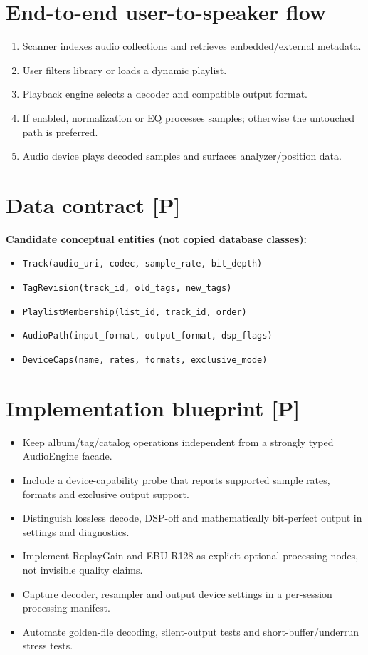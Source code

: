 \documentclass[10pt,a4paper,oneside]{report}
\begin{document}
\section{End-to-end user-to-speaker flow}
\begin{enumerate}[leftmargin=*,itemsep=2pt,topsep=2pt]
\item Scanner indexes audio collections and retrieves embedded/external metadata.
\item User filters library or loads a dynamic playlist.
\item Playback engine selects a decoder and compatible output format.
\item If enabled, normalization or EQ processes samples; otherwise the untouched path is preferred.
\item Audio device plays decoded samples and surfaces analyzer/position data.
\end{enumerate}
\section{Data contract [P]}
\begin{evidencebox}\small\textbf{Candidate conceptual entities (not copied database classes):}\par
\begin{itemize}[leftmargin=*,itemsep=1pt,topsep=2pt]
\item \texttt{Track(audio\_uri, codec, sample\_rate, bit\_depth)}
\item \texttt{TagRevision(track\_id, old\_tags, new\_tags)}
\item \texttt{PlaylistMembership(list\_id, track\_id, order)}
\item \texttt{AudioPath(input\_format, output\_format, dsp\_flags)}
\item \texttt{DeviceCaps(name, rates, formats, exclusive\_mode)}
\end{itemize}\end{evidencebox}
\section{Implementation blueprint [P]}
\begin{itemize}[leftmargin=*,itemsep=2pt,topsep=3pt]
\item Keep album/tag/catalog operations independent from a strongly typed AudioEngine facade.
\item Include a device-capability probe that reports supported sample rates, formats and exclusive output support.
\item Distinguish lossless decode, DSP-off and mathematically bit-perfect output in settings and diagnostics.
\item Implement ReplayGain and EBU R128 as explicit optional processing nodes, not invisible quality claims.
\item Capture decoder, resampler and output device settings in a per-session processing manifest.
\item Automate golden-file decoding, silent-output tests and short-buffer/underrun stress tests.
\end{itemize}
\end{document}
